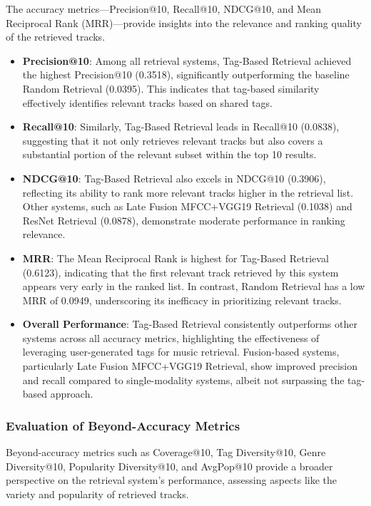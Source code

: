 \documentclass[sigconf]{acmart}
\begin{document}
The accuracy metrics—Precision@10, Recall@10, NDCG@10, and Mean Reciprocal Rank (MRR)—provide insights into the relevance and ranking quality of the retrieved tracks.

\begin{itemize}
    \item \textbf{Precision@10}: Among all retrieval systems, Tag-Based Retrieval achieved the highest Precision@10 (0.3518), significantly outperforming the baseline Random Retrieval (0.0395). This indicates that tag-based similarity effectively identifies relevant tracks based on shared tags.

    \item \textbf{Recall@10}: Similarly, Tag-Based Retrieval leads in Recall@10 (0.0838), suggesting that it not only retrieves relevant tracks but also covers a substantial portion of the relevant subset within the top 10 results.

    \item \textbf{NDCG@10}: Tag-Based Retrieval also excels in NDCG@10 (0.3906), reflecting its ability to rank more relevant tracks higher in the retrieval list. Other systems, such as Late Fusion MFCC+VGG19 Retrieval (0.1038) and ResNet Retrieval (0.0878), demonstrate moderate performance in ranking relevance.

    \item \textbf{MRR}: The Mean Reciprocal Rank is highest for Tag-Based Retrieval (0.6123), indicating that the first relevant track retrieved by this system appears very early in the ranked list. In contrast, Random Retrieval has a low MRR of 0.0949, underscoring its inefficacy in prioritizing relevant tracks.

    \item \textbf{Overall Performance}: Tag-Based Retrieval consistently outperforms other systems across all accuracy metrics, highlighting the effectiveness of leveraging user-generated tags for music retrieval. Fusion-based systems, particularly Late Fusion MFCC+VGG19 Retrieval, show improved precision and recall compared to single-modality systems, albeit not surpassing the tag-based approach.
\end{itemize}

\subsubsection{Evaluation of Beyond-Accuracy Metrics}

Beyond-accuracy metrics such as Coverage@10, Tag Diversity@10, Genre Diversity@10, Popularity Diversity@10, and AvgPop@10 provide a broader perspective on the retrieval system's performance, assessing aspects like the variety and popularity of retrieved tracks.
\end{document}
